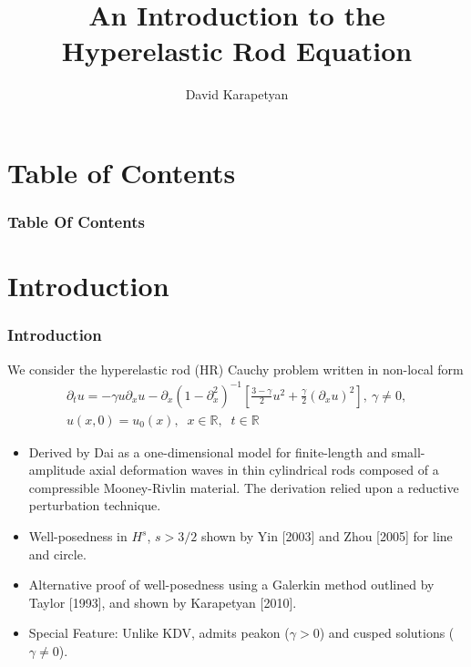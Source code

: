 \documentclass{beamer}
\date{}
\title{An Introduction to the Hyperelastic Rod Equation}
\author{David Karapetyan}
\institute{University of Rochester}
\numberwithin{equation}{section}
\newcommand{\rr}{\mathbb{R}}
\newcommand{\p}{\partial}
\begin{document}
\begin{frame}
    \titlepage
\end{frame}


\section*{Table of Contents}
\setcounter{section}{0}
\begin{frame}
	\frametitle{Table Of Contents}
	    \tableofcontents
	\end{frame}
	\section{Introduction}
        \begin{frame}
            \frametitle{Introduction}
We consider the hyperelastic rod (HR) Cauchy problem written in non-local form
\begin{gather*}
 \p_t u =  -\gamma u \p_x u -
 \p_{x} (1 - \p_{x}^{2})^{-1} \left[ \frac{3-\gamma}{2}u^2 +
\frac{\gamma}{2} \left( \p_x u \right)^2
\right], \ \gamma \neq 0,
\label{hyperelastic-rod-equation}
\\
 u(x,0) = u_0(x), \; \; x \in \rr, \; \; t \in \rr
\label{init-cond}
\end{gather*}
\begin{itemize}
        \pause
    \item
        Derived by Dai as a one-dimensional 
        model for finite-length and
        small-amplitude axial deformation waves in thin cylindrical
        rods composed of a compressible Mooney-Rivlin
        material. The derivation relied upon a reductive perturbation technique.
    \item 
       \pause 
       Well-posedness in $H^{s}$, $s > 3/2$ shown by Yin [2003]
       and Zhou [2005]
        for line and circle.
    \item 
       \pause 
        Alternative proof of well-posedness using a Galerkin method
	outlined by Taylor [1993], and shown by Karapetyan [2010]. 
   \pause 
\item 
    Special Feature: Unlike KDV, admits peakon ($\gamma > 0$) and cusped
    solutions ($\gamma \neq 0$).
\end{itemize}
\end{frame}
\end{document}
